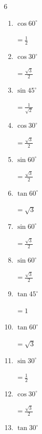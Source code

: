 \begin{multicols}{6}
\begin{enumerate}
        $\displaystyle =\frac{1}{2}$

  \item $\displaystyle \cos{60^\circ}$

        $\displaystyle =\frac{1}{2}$

  \item $\displaystyle \cos{30^\circ}$

        $\displaystyle =\frac{\sqrt{3}}{2}$

  \item $\displaystyle \sin{45^\circ}$

        $\displaystyle =\frac{1}{\sqrt{2}}$

  \item $\displaystyle \cos{30^\circ}$

        $\displaystyle =\frac{\sqrt{3}}{2}$

  \item $\displaystyle \sin{60^\circ}$

        $\displaystyle =\frac{\sqrt{3}}{2}$

  \item $\displaystyle \tan{60^\circ}$

        $\displaystyle =\sqrt{3}$

  \item $\displaystyle \sin{60^\circ}$

        $\displaystyle =\frac{\sqrt{3}}{2}$

  \item $\displaystyle \sin{60^\circ}$

        $\displaystyle =\frac{\sqrt{3}}{2}$

\columnbreak %

  \item $\displaystyle \tan{45^\circ}$

        $\displaystyle =1$

  \item $\displaystyle \tan{60^\circ}$

        $\displaystyle =\sqrt{3}$

  \item $\displaystyle \sin{30^\circ}$

        $\displaystyle =\frac{1}{2}$

  \item $\displaystyle \cos{30^\circ}$

        $\displaystyle =\frac{\sqrt{3}}{2}$

  \item $\displaystyle \tan{30^\circ}$


\end{enumerate}
\end{multicols}
